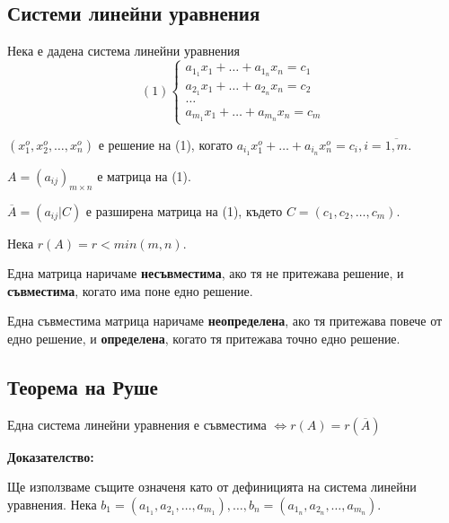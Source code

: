 \documentclass[fleqn,12pt]{article}
\begin{document}
\begin{flushleft}
    
    \vspace{5mm}
    
    
\section{Системи линейни уравнения}
Нека е дадена система линейни уравнения
\begin{equation*}
    (1)\begin{cases}
        a_{1_1}x_1+\dots+a_{1_n}x_n = c_1\\
        a_{2_1}x_1+\dots+a_{2_n}x_n = c_2\\
        \dots\\
        a_{m_1}x_1+\dots+a_{m_n}x_n = c_m
    \end{cases}
\end{equation*}

$(x_1^o, x_2^o, \dots, x_n^o)$ е решение на (1), когато $a_{i_1}x_1^o+\dots+a_{i_n}x_n^o = c_i, i = \overline{1,m}$.

$ A = (a_{ij})_{m \times n} $ е матрица на (1).

$ \overline{A} = (a_{ij} | C) $ е разширена матрица на (1), където $C = (c_1, c_2, \dots, c_m)$.

Нека $ r(A) = r < min(m, n) $. \\

\vspace{5mm}

Една матрица наричаме \textbf{несъвместима}, ако тя не притежава решение, и \textbf{съвместима}, когато има поне едно решение.

\vspace{5mm}

Една съвместима матрица наричаме \textbf{неопределена}, ако тя притежава повече от едно решение, и \textbf{определена}, когато тя притежава точно едно решение.


\subsection{Теорема на Руше}
Една система линейни уравнения е съвместима $ \Leftrightarrow r(A) = r(\overline{A}) $

\vspace{5mm}
    
    \textbf{Доказателство:}

    Ще използваме същите означеня като от дефиницията на система линейни уравнения.
    Нека $b_1 = (a_{1_1}, a_{2_1}, \dots, a_{m_1}), \dots, b_n = (a_{1_n}, a_{2_n}, \dots, a_{m_n})$.


\end{flushleft}
\end{document}
